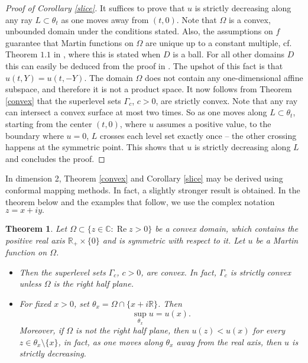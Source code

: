 \documentclass[11pt]{amsart}
\renewcommand{\Re}{\operatorname{Re}}
\newcommand{\C}{{\mathbb{C}}}
\newcommand{\R}{{\mathbb{R}}}
\newtheorem{thm}{Theorem}[section]
\theoremstyle{definition}
\theoremstyle{remark}
\begin{document}
\begin{proof}[Proof of Corollary \ref{slice}]
It suffices to prove that $u$ is strictly decreasing along any ray $L\subset\theta_t$ as one moves away from $(t,0)$. Note that $\Omega$ is a convex, unbounded domain under the conditions stated. Also, the assumptions on $f$ guarantee that Martin functions on $\Omega$ are unique up to a constant multiple, cf. Theorem $1.1$ in \cite{DeB}, where this is stated when $D$ is a ball. For all other domains $D$ this can easily be deduced from the proof in \cite{DeB}. The upshot of this fact is that $u(t, Y) = u(t, -Y).$ The domain $\Omega$ does not contain any one-dimensional affine subspace, and therefore it is not a product space. It now follows from Theorem \ref{convex} that the superlevel sets $\Gamma_c$, $c>0$, are strictly convex. Note that any ray can intersect a convex surface at most two times. So as one moves along $L\subset\theta_t$, starting from the center $(t,0)$, where $u$ assumes a positive value, to the boundary where $u=0$, $L$ crosses each level set exactly once -- the other crossing happens at the symmetric point. This shows that $u$ is strictly decreasing along $L$ and concludes the proof.
\end{proof}

\vspace{0.1in}

\noindent In dimension 2,  Theorem \ref{convex} and Corollary \ref{slice} may be derived using conformal mapping methods. In fact, a slightly stronger result is obtained. In the theorem below and the examples that follow, we use the complex notation $z = x+ iy.$ 

\begin{thm}
Let $\Omega \subset \{ z \in \C : \Re z > 0 \}$ be a convex domain,
which contains the positive real axis $\R_+\times\{0\}$ and is
symmetric with respect to it.  Let $u$ be a Martin function on $\Omega$.  
\begin{itemize}
  \item[(1)] Then the superlevel sets $\Gamma_c$, $c>0$, are convex. In fact, $\Gamma_c$ is strictly convex unless $\Omega$ is the right half plane.

\vspace{0.05in}

\item[(2)] For fixed $x>0$, set $\theta_{x}=\Omega\cap\{x+i\mathbb{R}\}$. Then 
$$\sup_{\theta_x} u = u(x).$$ 
Moreover, if $\Omega$ is not the right half plane, then $u(z) < u(x)$
for every $z \in \theta_x \setminus \{ x \}$, in fact, as one moves
along $\theta_x$ away from the real axis, then $u$ is strictly decreasing.
\end{itemize}
\end{thm}
\end{document}
